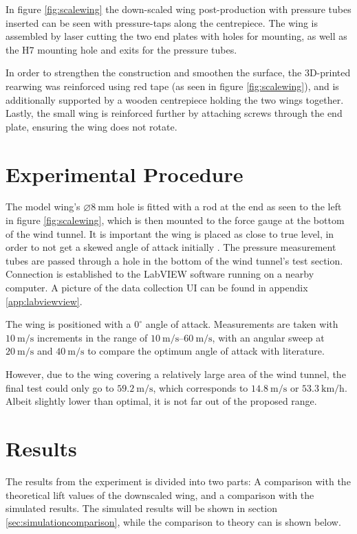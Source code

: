       In figure \ref{fig:scalewing} the down-scaled wing post-production with pressure tubes inserted can be seen with pressure-taps along the centrepiece. The wing is assembled by laser cutting the two end plates with holes for mounting, as well as the H7 mounting hole and exits for the pressure tubes.

      In order to strengthen the construction and smoothen the surface, the 3D-printed rearwing was reinforced using red tape (as seen in figure \ref{fig:scalewing}), and is additionally supported by a wooden centrepiece holding the two wings together. Lastly, the small wing is reinforced further by attaching screws through the end plate, ensuring the wing does not rotate.

\section{Experimental Procedure}

  The model wing's $\diameter\SI{8}{\milli\metre}$ hole is fitted with a rod at the end as seen to the left in figure \ref{fig:scalewing}, which is then mounted to the force gauge at the bottom of the wind tunnel. It is important the wing is placed as close to true level, in order to not get a skewed angle of attack initially \cite{truelevel}. The pressure measurement tubes are passed through a hole in the bottom of the wind tunnel's test section. Connection is established to the LabVIEW software running on a nearby computer. A picture of the data collection UI can be found in appendix \ref{app:labviewview}.

  The wing is positioned with a $0^\circ$ angle of attack. Measurements are taken with $\SI{10}{\metre\per\second}$ increments in the range of $\SIrange{10}{60}{\metre\per\second}$, with an angular sweep at $\SI{20}{\metre\per\second}$ and $\SI{40}{\metre\per\second}$ to compare the optimum angle of attack with literature.

  However, due to the wing covering a relatively large area of the wind tunnel, the final test could only go to $\SI{59.2}{\metre\per\second}$, which corresponds to $\SI{14.8}{\metre\per\second}$ or $\SI{53.3}{\kilo\metre\per\hour}$. Albeit slightly lower than optimal, it is not far out of the proposed range.

\section{Results}

  The results from the experiment is divided into two parts: A comparison with the theoretical lift values of the downscaled wing, and a comparison with the simulated results. The simulated results will be shown in section \ref{sec:simulationcomparison}, while the comparison to theory can is shown below.

